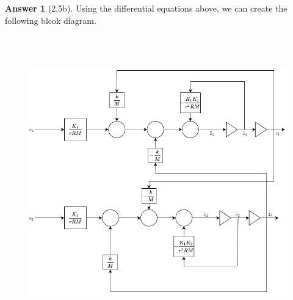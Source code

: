 \documentclass{article}
\theoremstyle{definition}
\newtheorem*{ans}{Answer}
\begin{document}
    \begin{ans}[2.5b]
        Using the differential equations above, we can create the
        following blcok diagram.
        \begin{figure}[H]
            \centering
            \includegraphics[height=5in]{Problem_2.5.png}
        \end{figure}
    \end{ans}
\end{document}
